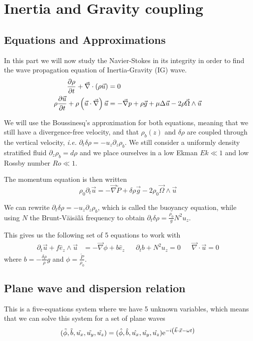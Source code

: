 
\section{Inertia and Gravity coupling}
\subsection{Equations and Approximations}
In this part we will now study the Navier-Stokes in its integrity in order to find the wave propagation equation of Inertia-Gravity (IG) wave.
\begin{align*}
	\frac{\partial \rho}{\partial t} + \vec{\nabla} \cdot \left( \rho \vec{u} \right) & = 0  \\
	\rho \frac{\partial \vec{u}}{\partial t} + \rho \left( \vec{u} \cdot \vec{\nabla} \right) \vec{u} & = - \vec{\nabla} p + \rho \vec{g} + \mu \Delta \vec{u} - 2 \rho \vec{\Omega} \wedge \vec{u}
\end{align*}

We will use the Boussinesq's approximation for both equations, meaning that we still have a divergence-free velocity, and that $\rho_b(z)$ and $\delta \rho$ are coupled through the vertical velocity, \textit{i.e.} $\partial_t \delta \rho = - u_z \partial_z \rho_b$. We still consider a uniformly density stratified fluid $\partial_z \rho_b = d\rho$ and we place ourselves in a low Ekman $Ek \ll 1$ and low Rossby number $Ro \ll 1$.

The momentum equation is then written
\begin{equation}
	\rho_0 \partial_t \vec{u} = - \vec{\nabla} \tilde{P} + \delta \rho \vec{g} - 2 \rho_0 \vec{\Omega} \wedge \vec{u} \label{eq:IG Momentum}
\end{equation}

We can rewrite $\partial_t \delta \rho = - u_z \partial_z \rho_b$, which is called the buoyancy equation, while using $N$ the Brunt-Väisälä frequency to obtain $\partial_t \delta \rho = \frac{\rho_0}{g} N^2 u_z$. 

This gives us the following set of 5 equations to work with
\begin{align}
	\partial_t \vec{u} +  f \hat{e}_z \wedge \vec{u} & = - \vec{\nabla} \phi + b \hat{e}_z && \partial_t b + N^2 u_z = 0 && \vec{\nabla} \cdot \vec{u} = 0 \label{eq:IG NS}
\end{align}
where $b = - \frac{\delta \rho}{\rho} g$ and $\phi = \frac{\tilde{P}}{\rho_0}$. 

\subsection{Plane wave and dispersion relation}
This is a five-equations system where we have 5 unknown variables, which means that we can solve this system for a set of plane waves 
\begin{equation*}
	(\tilde{\phi}, \tilde{b}, \tilde{u_x}, \tilde{u_y}, \tilde{u_z}) = (\hat{\phi}, \hat{b}, \hat{u_x}, \hat{u_y}, \hat{u_z}) \mathrm{e}^{-i \left( \vec{k} \cdot \vec{x} - \omega t \right)}
\end{equation*}

